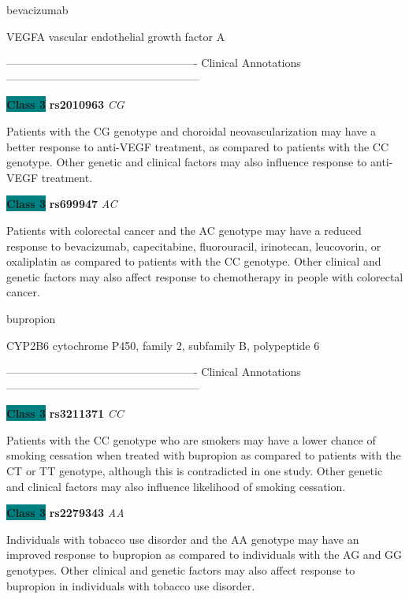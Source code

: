 \documentclass{resume} %
\begin{document}
\begin{rSection}{ bevacizumab }
\begin{rSubsection}{ VEGFA }{ vascular endothelial growth factor A }{}{}
\item[] ---------------------------------------------------- Clinical Annotations -----------------------------------------------------\newline
\item \textbf{\colorbox{teal} {Class 3}} \textbf{ rs2010963 } \textit{ CG }
\item[] Patients with the CG genotype and choroidal neovascularization may have a better response to anti-VEGF treatment, as compared to patients with the CC genotype. Other genetic and clinical factors may also influence response to anti-VEGF treatment. \item \textbf{\colorbox{teal} {Class 3}} \textbf{ rs699947 } \textit{ AC }
\item[] Patients with colorectal cancer and the AC genotype may have a reduced response to bevacizumab, capecitabine, fluorouracil, irinotecan, leucovorin, or oxaliplatin as compared to patients with the CC genotype. Other clinical and genetic factors may also affect response to chemotherapy in people with colorectal cancer.
\end{rSubsection}

\end{rSection}\begin{rSection}{ bupropion }
\item[]

\begin{rSubsection}{ CYP2B6 }{ cytochrome P450, family 2, subfamily B, polypeptide 6 }{}{}
\item[]

\item[] ---------------------------------------------------- Clinical Annotations -----------------------------------------------------\newline
\item \textbf{\colorbox{teal} {Class 3}} \textbf{ rs3211371 } \textit{ CC }
\item[] Patients with the CC genotype who are smokers may have a lower chance of smoking cessation when treated with bupropion as compared to patients with the CT or TT genotype, although this is contradicted in one study. Other genetic and clinical factors may also influence likelihood of smoking cessation.\item \textbf{\colorbox{teal} {Class 3}} \textbf{ rs2279343 } \textit{ AA }
\item[] Individuals with tobacco use disorder and the AA genotype may have an improved response to bupropion as compared to individuals with the AG and GG genotypes. Other clinical and genetic factors may also affect response to bupropion in individuals with tobacco use disorder. 
\end{rSubsection}


\end{rSection}
\end{document}
